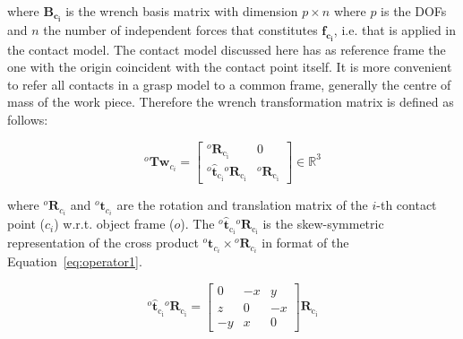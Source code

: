\noindent
where $\mathbf{{B}_{c_i}}$ is the wrench basis matrix with dimension $p \times n$ where $p$ is the \acp{DOF} and $n$ the number of independent forces that constitutes $\mathbf{{f}_{c_i}}$, i.e. that is applied in the contact model. The contact model discussed here has as reference frame the one with the origin coincident with the contact point itself. It is more convenient to refer all contacts in a grasp model to a common frame, generally the centre of mass of the work piece. Therefore the wrench transformation matrix is defined as follows:

\begin{equation}
^{o} \mathbf{Tw}_{c_i}=\left[\begin{array}{cc}
{^{o} \mathbf{R}_{\mathrm{c_i}}} & {0} \\
{^o \widehat{\mathbf{t}}_{\mathrm{c_i}} {}^{o} \mathbf{R}_{\mathrm{c_i}}} & {^{o} \mathbf{R}_{\mathrm{c_i}}}
\end{array}\right]
\in \mathbb{R}^3
\end{equation}

\noindent
where $ ^o\mathbf{R}_{c_i}$ and $^o\mathbf{t}_{c_i}$ are the rotation and translation matrix of the $i$-th contact point ($c_i$) w.r.t. object frame ($o$). The $^o \hat{\mathbf{t}}_{\mathrm{c_i}} {}^{o} \mathbf{R}_{\mathrm{c_i}}$ is the skew-symmetric representation of the cross product $^o\mathbf{t}_{c_i} \times {{{}^o}\mathbf{R}}_{c_i}$ in format of the Equation~\ref{eq:operator1}.%


\begin{equation}
^o \hat{\mathbf{t}}_{\mathrm{c_i}} {}^{o} \mathbf{R}_{\mathrm{c_i}}=\left[\begin{array}{ccc}
	0 & -x & y \\
	z & 0 & -x \\
	-y & x & 0
	\end{array}\right] \mathbf{R}_{\mathrm{c_i}}
	\label{eq:operator1}
	\end{equation}


